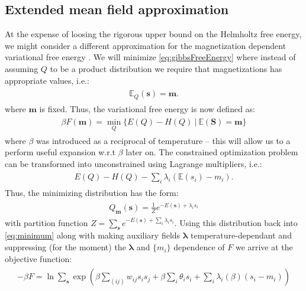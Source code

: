 \documentclass[../report/report.tex]{subfiles}
\begin{document}
\subsection{Extended mean field approximation}
At the expense of loosing the rigorous upper bound on the Helmholtz free energy, we might consider a different approximation for the magnetization dependent variational free energy \cite{georges1991expand}. We will minimize \ref{eq:gibbsFreeEnergy} where instead of assuming $Q$ to be a product distribution we require that magnetizations has appropriate values, i.e.:
\begin{align}
\begin{split}
\mathbb{E}_Q (\mathbf{s}) = \mathbf{m} .
\label{eq:constraint}
\end{split}
\end{align}
 where $\mathbf{m}$ is fixed. Thus, the variational free energy is now defined as: 
 \begin{align}
\begin{split}
\beta F(\mathbf{m}) = \min_{Q} \{E(Q) - H(Q) ~|~\mathbb{E}(\mathbf{S}) = \mathbf{m} \}
\label{eq:minimum}
\end{split}
\end{align}
	where $\beta$ was introduced as a reciprocal of temperature -- this will allow us to a perform useful expansion w.r.t $\beta$ later on. The constrained optimization problem can be transformed into unconstrained using Lagrange multipliers, i.e.:
 \begin{align}
\begin{split}
E(Q) - H(Q) -  \sum_i \lambda_i(\mathbb{E}(s_i) - m_i). 
\end{split}
\end{align}
Thus, the minimizing distribution has the form:
 \begin{align}
\begin{split}
Q_{\mathbf{m}}(\mathbf{s}) = \frac{1}{Z} e^{-E(\mathbf{s}) + \lambda_i s_i}
\end{split}
\end{align}
with partition function $Z = \sum_{\mathbf{s}} e^{-E(\mathbf{s}) + \sum_i \lambda_i s_i}$. Using this distribution back into \ref{eq:minimum} along with making auxiliary fields $\mathbf{\lambda}$ temperature-dependant and suppressing (for the moment) the $\mathbf{\lambda}$ and $\{m_i \}$ dependence of $F$ we arrive at the objective function:
 \begin{align}
\begin{split} - \beta F = \ln \sum_{\mathbf{s}} \exp \left( \beta \sum_{(ij)} w_{ij} s_i s_j +\beta \sum_i  \theta_i s_i  + \sum_i \lambda_i (\beta) (s_i - m_i) \right)
\end{split}
\end{align}
\end{document}
